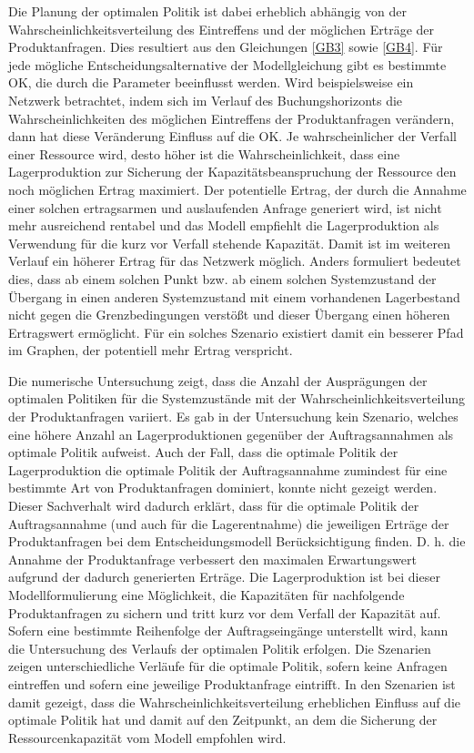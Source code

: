 Die Planung der optimalen Politik ist dabei erheblich abhängig von der Wahrscheinlichkeitsverteilung des Eintreffens und der möglichen Erträge der Produktanfragen. Dies resultiert aus den Gleichungen \eqref{GB3} sowie \eqref{GB4}. Für jede mögliche Entscheidungsalternative der Modellgleichung gibt es bestimmte OK, die durch die Parameter beeinflusst werden. Wird beispielsweise ein Netzwerk betrachtet, indem sich im Verlauf des Buchungshorizonts die Wahrscheinlichkeiten des möglichen Eintreffens der Produktanfragen verändern, dann hat diese Veränderung Einfluss auf die OK. Je wahrscheinlicher der Verfall einer Ressource wird, desto höher ist die Wahrscheinlichkeit, dass eine Lagerproduktion zur Sicherung der Kapazitätsbeanspruchung der Ressource den noch möglichen Ertrag maximiert. Der potentielle Ertrag, der durch die Annahme einer solchen ertragsarmen und auslaufenden Anfrage generiert wird, ist nicht mehr ausreichend rentabel und das Modell empfiehlt die Lagerproduktion als Verwendung für die kurz vor Verfall stehende Kapazität. Damit ist im weiteren Verlauf ein höherer Ertrag für das Netzwerk möglich. Anders formuliert bedeutet dies, dass ab einem solchen Punkt bzw. ab einem solchen Systemzustand der Übergang in einen anderen Systemzustand mit einem vorhandenen Lagerbestand nicht gegen die Grenzbedingungen verstößt und dieser Übergang einen höheren Ertragswert ermöglicht. Für ein solches Szenario existiert damit ein besserer Pfad im Graphen, der potentiell mehr Ertrag verspricht.

Die numerische Untersuchung zeigt, dass die Anzahl der Ausprägungen der optimalen Politiken für die Systemzustände mit der Wahrscheinlichkeitsverteilung der Produktanfragen variiert. Es gab in der Untersuchung kein Szenario, welches eine höhere Anzahl an Lagerproduktionen gegenüber der Auftragsannahmen als optimale Politik aufweist. Auch der Fall, dass die optimale Politik der Lagerproduktion die optimale Politik der Auftragsannahme zumindest für eine bestimmte Art von Produktanfragen dominiert, konnte nicht gezeigt werden. Dieser Sachverhalt wird dadurch erklärt, dass für die optimale Politik der Auftragsannahme (und auch für die Lagerentnahme) die jeweiligen Erträge der Produktanfragen bei dem Entscheidungsmodell Berücksichtigung finden. D. h. die Annahme der Produktanfrage verbessert den maximalen Erwartungswert aufgrund der dadurch generierten Erträge. Die Lagerproduktion ist bei dieser Modellformulierung eine Möglichkeit, die Kapazitäten für nachfolgende Produktanfragen zu sichern und tritt kurz vor dem Verfall der Kapazität auf. Sofern eine bestimmte Reihenfolge der Auftragseingänge unterstellt wird, kann die Untersuchung des Verlaufs der optimalen Politik erfolgen. Die Szenarien zeigen unterschiedliche Verläufe für die optimale Politik, sofern keine Anfragen eintreffen und sofern eine jeweilige Produktanfrage eintrifft. In den Szenarien ist damit gezeigt, dass die Wahrscheinlichkeitsverteilung erheblichen Einfluss auf die optimale Politik hat und damit auf den Zeitpunkt, an dem die Sicherung der Ressourcenkapazität vom Modell empfohlen wird. 

